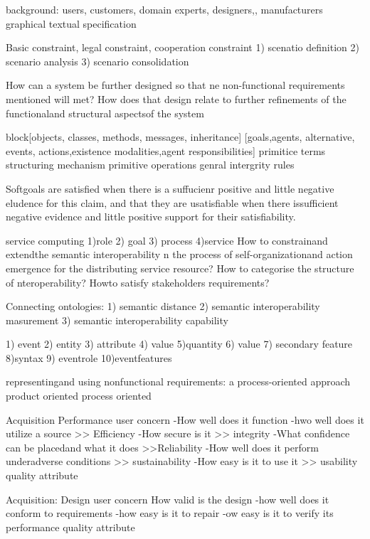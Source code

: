 background: users, customers, domain experts, designers,, manufacturers
graphical  textual specification

Basic constraint, legal constraint, cooperation constraint
1) scenatio  definition
2) scenario analysis
3) scenario consolidation

How can a system be 	 further designed	so that ne non-functional requirements mentioned will met?
How does that design relate to further refinements of the functionaland structural aspectsof the system

block[objects, classes, methods, messages, inheritance]
[goals,agents, alternative, events, actions,existence modalities,agent responsibilities]
primitice terms
structuring mechanism
primitive operations
genral intergrity rules

Softgoals are satisfied when there is a suffucienr positive and little negative eludence for this claim, and that they are usatisfiable when there issufficient negative evidence and little positive support for their satisfiability.



service computing
1)role
2) goal
3) process
4)service
How to constrainand extendthe semantic interoperability n the process of self-organizationand action emergence for the distributing service resource?
How to categorise the  structure of nteroperability?
Howto satisfy stakeholders requirements?


Connecting ontologies:
1) semantic distance
2) semantic interoperability masurement
3) semantic interoperability capability

1) event
2) entity
3) attribute
4) value
5)quantity
6) value
7) secondary feature
8)syntax
9) eventrole
10)eventfeatures





representingand using nonfunctional requirements: a process-oriented approach
product oriented
process oriented


Acquisition Performance
user concern
-How well does it function
-hwo well does it utilize a source >> Efficiency
-How secure is it >> integrity
-What confidence can be placedand what it does >>Reliability
-How well does it perform underadverse conditions >> sustainability
-How easy is it to use it >> usability
quality attribute


Acquisition: Design
user concern
How valid is the design
-how well does it conform to requirements
-how easy is it to repair
-ow easy is it to verify its performance
quality attribute


